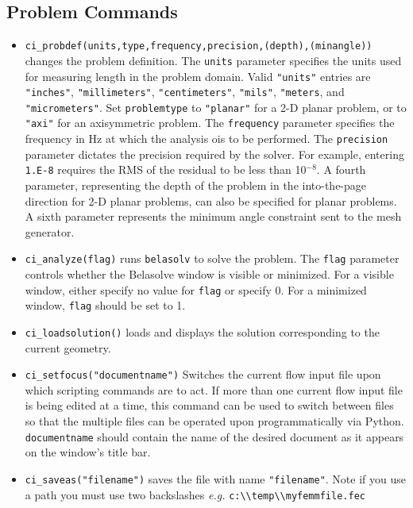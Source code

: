 \subsection{Problem Commands}

\begin{itemize}
\item {\tt ci\_probdef(units,type,frequency,precision,(depth),(minangle))} changes the problem
definition. The \texttt{units} parameter specifies the units used
for measuring length in the problem domain. Valid \texttt{"units"}
entries are
\texttt{"inches"}, \texttt{"millimeters"}, \texttt{"centimeters"},
\texttt{"mils"}, \texttt{"meters}, and \texttt{"micrometers"}. Set
\texttt{problemtype} to \texttt{"planar"} for a 2-D planar problem, or to
\texttt{"axi"} for an axisymmetric problem. The \texttt{frequency} parameter specifies the frequency
in Hz at which the analysis ois to be performed. The \texttt{precision} parameter
dictates the precision required by the solver. For example, entering
\texttt{1.E-8} requires the RMS of the residual to be less than 10$^{ - 8}$.
A fourth parameter, representing the depth of the problem in the
into-the-page direction for 2-D planar problems, can also be specified
for planar problems. A sixth parameter represents the minimum angle constraint sent to the mesh generator.

\item {\tt ci\_analyze(flag)} runs \texttt{belasolv} to solve the problem. The
\texttt{flag} parameter controls whether the Belasolve window is visible or
minimized. For a visible window, either specify no value for
\texttt{flag} or specify 0. For a minimized window, \texttt{flag}
should be set to 1.

\item {\tt ci\_loadsolution()} loads and displays the solution corresponding to the
current geometry.

\item {\tt ci\_setfocus("documentname")} Switches the
current flow input file upon which scripting commands are to act. If
more than one current flow input file is being edited at a time,
this command can be used to switch between files so that the
multiple files can be operated upon programmatically via Python. {\tt
documentname} should contain the name of the desired document as
it appears on the window's title bar.

\item {\tt ci\_saveas("filename")} saves the file with name
\texttt{"filename"}. Note if you use a path you must use two backslashes
{\em e.g.} \verb+c:\\temp\\myfemmfile.fec+

\end{itemize}

